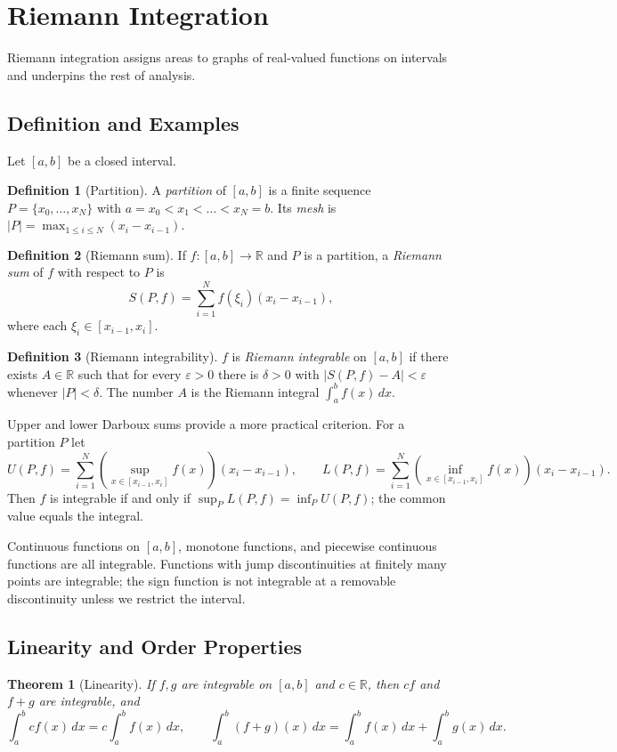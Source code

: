 \documentclass{article}
\theoremstyle{definition}
\newtheorem{definition}{Definition}[section]
\theoremstyle{plain}
\newtheorem{theorem}{Theorem}[section]
\begin{document}
\section{Riemann Integration}\label{sec:riemann-integration}
Riemann integration assigns areas to graphs of real-valued functions on intervals and underpins the rest of analysis.

\subsection{Definition and Examples}\label{subsec:riemann-definition}
Let $[a,b]$ be a closed interval.
\begin{definition}[Partition]\label{def:partition}
	A \emph{partition} of $[a,b]$ is a finite sequence $P = \{x_0,\dots,x_N\}$ with $a=x_0<x_1<\dots<x_N=b$. Its \emph{mesh} is $|P| = \max_{1\le i\le N}(x_i - x_{i-1})$.
\end{definition}

\begin{definition}[Riemann sum]\label{def:riemann-sum}
	If $f:[a,b]\to \mathbb{R}$ and $P$ is a partition, a \emph{Riemann sum} of $f$ with respect to $P$ is
	\[
		S(P,f) = \sum_{i=1}^N f(\xi_i)(x_i - x_{i-1}),
	\]
	where each $\xi_i \in [x_{i-1},x_i]$.
\end{definition}

\begin{definition}[Riemann integrability]\label{def:riemann-integrable}
	$f$ is \emph{Riemann integrable} on $[a,b]$ if there exists $A\in \mathbb{R}$ such that for every $\varepsilon>0$ there is $\delta>0$ with $|S(P,f)-A|<\varepsilon$ whenever $|P|<\delta$. The number $A$ is the Riemann integral $\int_a^b f(x)\,dx$.
\end{definition}

Upper and lower Darboux sums provide a more practical criterion. For a partition $P$ let
\[
	U(P,f) = \sum_{i=1}^N \left(\sup_{x\in [x_{i-1},x_i]} f(x)\right)(x_i - x_{i-1}), \qquad
	L(P,f) = \sum_{i=1}^N \left(\inf_{x\in [x_{i-1},x_i]} f(x)\right)(x_i - x_{i-1}).
\]
Then $f$ is integrable if and only if $\sup_P L(P,f) = \inf_P U(P,f)$; the common value equals the integral.

Continuous functions on $[a,b]$, monotone functions, and piecewise continuous functions are all integrable. Functions with jump discontinuities at finitely many points are integrable; the sign function is not integrable at a removable discontinuity unless we restrict the interval.

\subsection{Linearity and Order Properties}\label{subsec:riemann-linearity}
\begin{theorem}[Linearity]\label{thm:riemann-linearity}
	If $f,g$ are integrable on $[a,b]$ and $c\in \mathbb{R}$, then $cf$ and $f+g$ are integrable, and
	\[
		\int_a^b cf(x)\,dx = c \int_a^b f(x)\,dx, \qquad \int_a^b (f+g)(x)\,dx = \int_a^b f(x)\,dx + \int_a^b g(x)\,dx.
	\]
\end{theorem}
\end{document}
